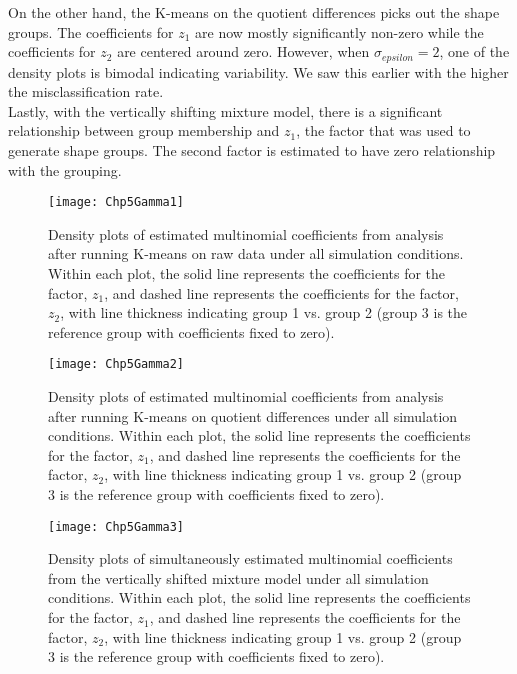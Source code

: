 \documentclass[12pt]{article}
\begin{document}
On the other hand, the K-means on the quotient differences picks out the shape groups. The coefficients for $z_{1}$ are now mostly significantly non-zero while the coefficients for $z_{2}$ are centered around zero. However, when $\sigma_{epsilon}=2$, one of the density plots is bimodal indicating variability. We saw this earlier with the higher the misclassification rate.\\

Lastly, with the vertically shifting mixture model, there is a significant relationship between group membership and $z_{1}$, the factor that was used to generate shape groups. The second factor is estimated to have zero relationship with the grouping.

\begin{figure}[h]
\begin{center}
\texttt{[image: Chp5Gamma1]}
\end{center}
\label{fig:gamma1}
\caption{Density plots of estimated multinomial coefficients from analysis after running K-means on raw data under all simulation conditions. Within each plot, the solid line represents the coefficients for the factor, $z_{1}$, and dashed line represents the coefficients for the factor, $z_{2}$, with line thickness indicating group 1 vs. group 2 (group 3 is the reference group with coefficients fixed to zero).}
\end{figure}
\begin{figure}[h]
\begin{center}
\texttt{[image: Chp5Gamma2]}
\end{center}
\label{fig:gamma1}
\caption{Density plots of estimated multinomial coefficients from analysis after running K-means on quotient differences under all simulation conditions. Within each plot, the solid line represents the coefficients for the factor, $z_{1}$, and dashed line represents the coefficients for the factor, $z_{2}$, with line thickness indicating group 1 vs. group 2 (group 3 is the reference group with coefficients fixed to zero).}
\end{figure}
\begin{figure}[h]
\begin{center}
\texttt{[image: Chp5Gamma3]}
\end{center}
\label{fig:gamma1}
\caption{Density plots of simultaneously estimated multinomial coefficients from the vertically shifted mixture model under all simulation conditions. Within each plot, the solid line represents the coefficients for the factor, $z_{1}$, and dashed line represents the coefficients for the factor, $z_{2}$, with line thickness indicating group 1 vs. group 2 (group 3 is the reference group with coefficients fixed to zero).}
\end{figure}
\end{document}
